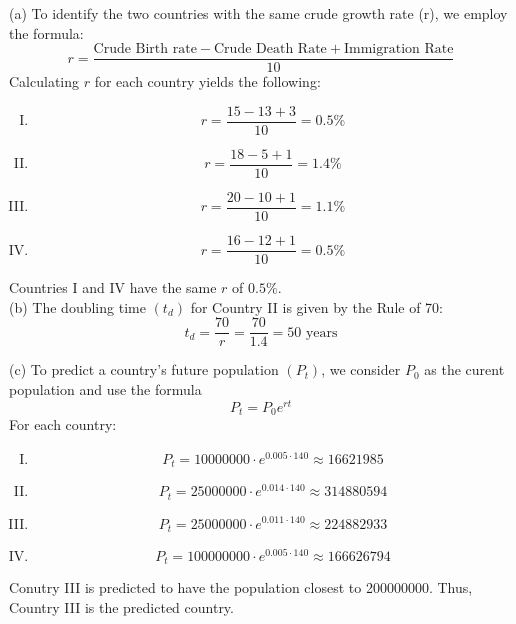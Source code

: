 \documentclass[11pt]{article}
\newcommand*{\vs}{\vspace{1cm}}
\newcommand*{\next}{\noindent}
\begin{document}
\next
(a) To identify the two countries with the same crude growth rate (r), we employ the formula:
\[r=\frac{\text{Crude Birth rate} - \text{Crude Death Rate} + \text{Immigration Rate}}{10}\]
Calculating $r$ for each country yields the following:
\begin{enumerate}[I.]
    \item \[r=\frac{15-13+3}{10}=0.5\%\]
    \item \[r=\frac{18-5+1}{10}=1.4\%\]
    \item \[r=\frac{20-10+1}{10}=1.1\%\]
    \item \[r=\frac{16-12+1}{10}=0.5\%\]
\end{enumerate}
Countries I and IV have the same $r$ of $0.5\%$.\\

\vs\next
(b) The doubling time $(t_d)$ for Country II is given by the Rule of 70:
\[t_d=\frac{70}{r}=\frac{70}{1.4}=50\,\,\text{years}\]

\next
(c) To predict a country's future population $(P_t)$, we consider $P_0$ as the curent population and use the formula
\[P_t=P_0e^{rt}\]
For each country:
\begin{enumerate}[I.]
    \item \[P_t=10000000\cdot e^{0.005\cdot 140}\approx 16621985\]
    \item \[P_t=25000000\cdot e^{0.014\cdot 140}\approx 314880594\]
    \item \[P_t=25000000\cdot e^{0.011\cdot 140}\approx 224882933\]
    \item \[P_t=100000000\cdot e^{0.005\cdot 140}\approx 166626794\]
\end{enumerate}

Conutry III is predicted to have the population closest to 200000000. Thus, Country III is the predicted country.
\end{document}
